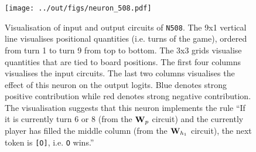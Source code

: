 \begin{figure}[t]
    \centering
    \texttt{[image: ../out/figs/neuron\_508.pdf]}
    \caption{Visualisation of input and output circuits of \texttt{N508}. The 9x1 vertical line visualises positional quantities (i.e. turns of the game), ordered from turn 1 to turn 9 from top to bottom. The 3x3 grids visualise quantities that are tied to board positions. The first four columns visualises the input circuits. The last two columns visualises the effect of this neuron on the output logits. Blue denotes strong positive contribution while red denotes strong negative contribution. The visualisation suggests that this neuron implements the rule ``If it is currently turn 6 or 8 (from the $\mathbf{\bm{W}}_p$ circuit) and the currently player has filled the middle column (from the $\mathbf{\bm{W}}_{h_1}$ circuit), the next token is \texttt{[O]}, i.e. \texttt{O} wins.''}
    \label{fig:neuron-sample}
\end{figure}